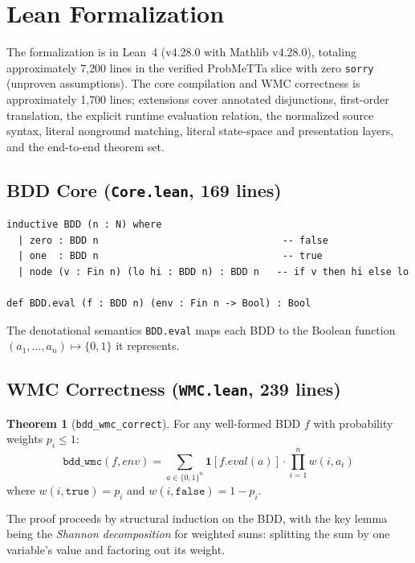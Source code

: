 \documentclass[11pt,a4paper]{article}
\theoremstyle{definition}
\newtheorem{theorem}{Theorem}[section]
\begin{document}
\section{Lean Formalization}

The formalization is in Lean~4 (v4.28.0 with Mathlib v4.28.0), totaling
approximately 7{,}200 lines in the verified ProbMeTTa slice with zero
\texttt{sorry} (unproven assumptions). The core compilation and WMC correctness
is approximately 1{,}700 lines; extensions cover annotated disjunctions,
first-order translation, the explicit runtime evaluation relation, the
normalized source syntax, literal nonground matching, literal state-space and
presentation layers, and the end-to-end theorem set.

\subsection{BDD Core (\texttt{Core.lean}, 169 lines)}

\begin{lstlisting}[language={}]
inductive BDD (n : N) where
  | zero : BDD n                                -- false
  | one  : BDD n                                -- true
  | node (v : Fin n) (lo hi : BDD n) : BDD n   -- if v then hi else lo

def BDD.eval (f : BDD n) (env : Fin n -> Bool) : Bool
\end{lstlisting}

The denotational semantics \texttt{BDD.eval} maps each BDD to the Boolean
function $(a_1,\ldots,a_n) \mapsto \{0,1\}$ it represents.

\subsection{WMC Correctness (\texttt{WMC.lean}, 239 lines)}

\begin{theorem}[\texttt{bdd\_wmc\_correct}]
For any well-formed BDD $f$ with probability weights $p_i \leq 1$:
\[
\texttt{bdd\_wmc}(f, \mathit{env}) = \sum_{a \in \{0,1\}^n} \mathbf{1}[f.\mathit{eval}(a)] \cdot \prod_{i=1}^n w(i, a_i)
\]
where $w(i, \texttt{true}) = p_i$ and $w(i, \texttt{false}) = 1 - p_i$.
\end{theorem}

The proof proceeds by structural induction on the BDD, with the key lemma
being the \emph{Shannon decomposition} for weighted sums: splitting the sum
by one variable's value and factoring out its weight.
\end{document}
